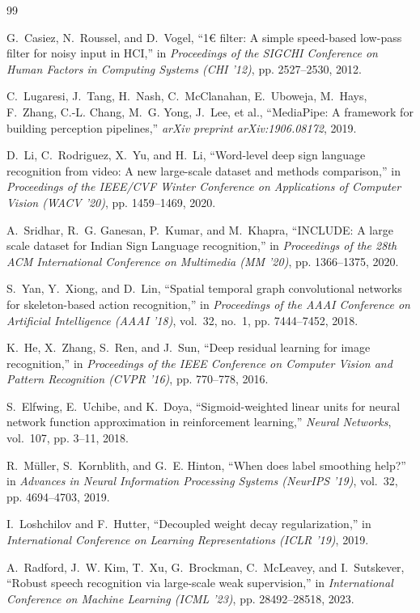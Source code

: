 \begin{thebibliography}{99}

G.~Casiez, N.~Roussel, and D.~Vogel,
\newblock ``1€ filter: A simple speed-based low-pass filter for noisy input in HCI,''
\newblock in \textit{Proceedings of the SIGCHI Conference on Human Factors in Computing Systems (CHI '12)}, pp. 2527--2530, 2012.

C.~Lugaresi, J.~Tang, H.~Nash, C.~McClanahan, E.~Uboweja, M.~Hays, F.~Zhang, C.-L. Chang, M.~G. Yong, J.~Lee, et al.,
\newblock ``MediaPipe: A framework for building perception pipelines,''
\newblock \textit{arXiv preprint arXiv:1906.08172}, 2019.

D.~Li, C.~Rodriguez, X.~Yu, and H.~Li,
\newblock ``Word-level deep sign language recognition from video: A new large-scale dataset and methods comparison,''
\newblock in \textit{Proceedings of the IEEE/CVF Winter Conference on Applications of Computer Vision (WACV '20)}, pp. 1459--1469, 2020.

A.~Sridhar, R.~G. Ganesan, P.~Kumar, and M.~Khapra,
\newblock ``INCLUDE: A large scale dataset for Indian Sign Language recognition,''
\newblock in \textit{Proceedings of the 28th ACM International Conference on Multimedia (MM '20)}, pp. 1366--1375, 2020.

S.~Yan, Y.~Xiong, and D.~Lin,
\newblock ``Spatial temporal graph convolutional networks for skeleton-based action recognition,''
\newblock in \textit{Proceedings of the AAAI Conference on Artificial Intelligence (AAAI '18)}, vol.~32, no.~1, pp. 7444--7452, 2018.

K.~He, X.~Zhang, S.~Ren, and J.~Sun,
\newblock ``Deep residual learning for image recognition,''
\newblock in \textit{Proceedings of the IEEE Conference on Computer Vision and Pattern Recognition (CVPR '16)}, pp. 770--778, 2016.

S.~Elfwing, E.~Uchibe, and K.~Doya,
\newblock ``Sigmoid-weighted linear units for neural network function approximation in reinforcement learning,''
\newblock \textit{Neural Networks}, vol.~107, pp. 3--11, 2018.

R.~M{\"u}ller, S.~Kornblith, and G.~E. Hinton,
\newblock ``When does label smoothing help?''
\newblock in \textit{Advances in Neural Information Processing Systems (NeurIPS '19)}, vol.~32, pp. 4694--4703, 2019.

I.~Loshchilov and F.~Hutter,
\newblock ``Decoupled weight decay regularization,''
\newblock in \textit{International Conference on Learning Representations (ICLR '19)}, 2019.

A.~Radford, J.~W. Kim, T.~Xu, G.~Brockman, C.~McLeavey, and I.~Sutskever,
\newblock ``Robust speech recognition via large-scale weak supervision,''
\newblock in \textit{International Conference on Machine Learning (ICML '23)}, pp. 28492--28518, 2023.

\end{thebibliography}

